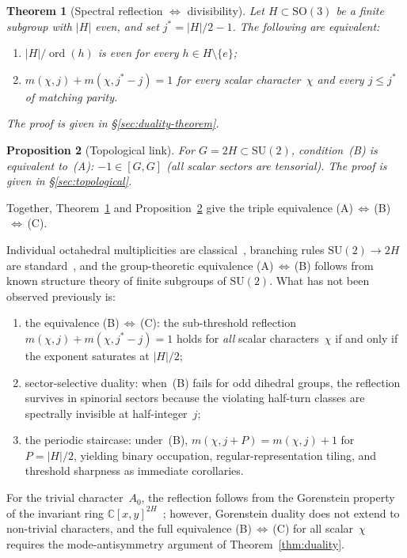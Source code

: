 \documentclass[12pt]{article}
\newtheorem{theorem}{Theorem}[section]
\newtheorem{proposition}[theorem]{Proposition}
\theoremstyle{definition}
\theoremstyle{remark}
\newcommand{\CC}{\mathbb{C}}
\newcommand{\SU}{\mathrm{SU}}
\newcommand{\SO}{\mathrm{SO}}
\DeclareMathOperator{\ord}{ord}
\begin{document}
\begin{theorem}[Spectral reflection $\Leftrightarrow$ divisibility]
\label{thm:main}
Let $H \subset \SO(3)$ be a finite subgroup with
$|H|$ even, and set $j^* = |H|/2 - 1$.
The following are equivalent:
\begin{enumerate}
  \item[\textup{(B)}] $|H|/\ord(h)$ is even for every
    $h \in H \setminus\{e\}$;
  \item[\textup{(C)}] $m(\chi,j) + m(\chi, j^*{-}j) = 1$
    for every scalar character~$\chi$ and every
    $j \le j^*$ of matching parity.
\end{enumerate}
The proof is given in \S\ref{sec:duality-theorem}.
\end{theorem}

\begin{proposition}[Topological link]
\label{prop:intro-A-iff-B}
For $G = 2H \subset \SU(2)$, condition~\textup{(B)} is
equivalent to~\textup{(A)}: $-1 \in [G,G]$
\textup{(}all scalar sectors are tensorial\textup{)}.
The proof is given in \S\ref{sec:topological}.
\end{proposition}

\noindent
Together, Theorem~\ref{thm:main} and
Proposition~\ref{prop:intro-A-iff-B} give the triple equivalence
\textup{(A)}$\,\Leftrightarrow\,$\textup{(B)}$\,\Leftrightarrow\,$\textup{(C)}.

Individual octahedral multiplicities are
classical~\cite{Hecht1960}, branching rules
$\SU(2) \to 2H$ are standard~\cite{BrockerTomDieck1985,AltmannHerzig1994},
and the group-theoretic equivalence
(A)$\,\Leftrightarrow\,$(B) follows from known
structure theory of finite subgroups of $\SU(2)$.
What has not been observed previously is:
\begin{enumerate}
\item[(i)] the equivalence
  (B)$\,\Leftrightarrow\,$(C): the sub-threshold
  reflection $m(\chi,j) + m(\chi,j^*{-}j) = 1$
  holds for \emph{all} scalar characters~$\chi$
  if and only if the exponent saturates at $|H|/2$;
\item[(ii)] sector-selective duality: when~(B) fails
  for odd dihedral groups, the reflection survives in
  spinorial sectors because the violating half-turn
  classes are spectrally invisible at half-integer~$j$;
\item[(iii)] the periodic staircase:
  under~(B), $m(\chi, j{+}P) = m(\chi, j) + 1$
  for $P = |H|/2$, yielding binary occupation,
  regular-representation tiling, and threshold sharpness
  as immediate corollaries.
\end{enumerate}
For the trivial character~$A_0$, the reflection
follows from the Gorenstein property of the invariant
ring $\CC[x,y]^{2H}$~\cite{Watanabe1974}; however,
Gorenstein duality does not extend to non-trivial
characters, and the full equivalence
(B)$\,\Leftrightarrow\,$(C) for all scalar~$\chi$
requires the mode-antisymmetry argument of
Theorem~\ref{thm:duality}.
\end{document}

